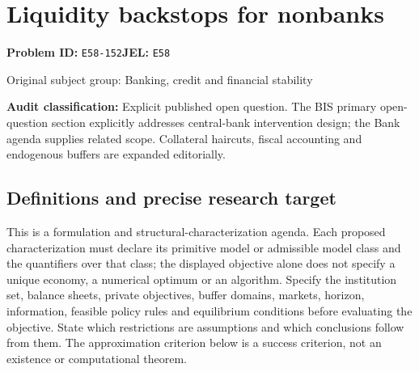 \documentclass[11pt,a4paper]{article}
\begin{document}
\section*{Liquidity backstops for nonbanks}
\textbf{Problem ID:} \texttt{E58-152}\quad \textbf{JEL:} \texttt{E58}\par
\label{problem:OP-0326}
{\sffamily\small\color{muted}Original subject group: Banking, credit and financial stability\par}
\label{definitions:problem:30007608}
\textbf{Audit classification:} Explicit published open question. The BIS primary open-question section explicitly addresses central-bank intervention design; the Bank agenda supplies related scope. Collateral haircuts, fiscal accounting and endogenous buffers are expanded editorially.
\subsection*{Definitions and precise research target}
This is a formulation and structural-characterization agenda. Each proposed characterization must declare its primitive model or admissible model class and the quantifiers over that class; the displayed objective alone does not specify a unique economy, a numerical optimum or an algorithm. Specify the institution set, balance sheets, private objectives, buffer domains, markets, horizon, information, feasible policy rules and equilibrium conditions before evaluating the objective. State which restrictions are assumptions and which conclusions follow from them. The approximation criterion below is a success criterion, not an existence or computational theorem.
\end{document}
